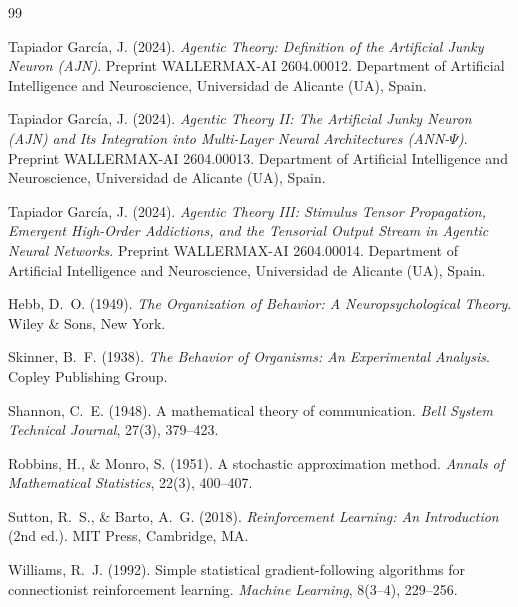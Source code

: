 \documentclass[12pt,a4paper]{article}
\begin{document}
\begin{thebibliography}{99}


Tapiador Garc\'ia, J. (2024).
\textit{Agentic Theory: Definition of the Artificial Junky Neuron (AJN)}.
Preprint WALLERMAX-AI 2604.00012.
Department of Artificial Intelligence and Neuroscience,
Universidad de Alicante (UA), Spain.

Tapiador Garc\'ia, J. (2024).
\textit{Agentic Theory II: The Artificial Junky Neuron (AJN) and Its Integration
into Multi-Layer Neural Architectures (ANN-$\Psi$)}.
Preprint WALLERMAX-AI 2604.00013.
Department of Artificial Intelligence and Neuroscience,
Universidad de Alicante (UA), Spain.

Tapiador Garc\'ia, J. (2024).
\textit{Agentic Theory III: Stimulus Tensor Propagation, Emergent High-Order
Addictions, and the Tensorial Output Stream in Agentic Neural Networks}.
Preprint WALLERMAX-AI 2604.00014.
Department of Artificial Intelligence and Neuroscience,
Universidad de Alicante (UA), Spain.


Hebb, D.~O. (1949).
\textit{The Organization of Behavior: A Neuropsychological Theory}.
Wiley \& Sons, New York.

Skinner, B.~F. (1938).
\textit{The Behavior of Organisms: An Experimental Analysis}.
Copley Publishing Group.

Shannon, C.~E. (1948).
A mathematical theory of communication.
\textit{Bell System Technical Journal}, 27(3), 379--423.

Robbins, H., \& Monro, S. (1951).
A stochastic approximation method.
\textit{Annals of Mathematical Statistics}, 22(3), 400--407.


Sutton, R.~S., \& Barto, A.~G. (2018).
\textit{Reinforcement Learning: An Introduction} (2nd ed.).
MIT Press, Cambridge, MA.

Williams, R.~J. (1992).
Simple statistical gradient-following algorithms for connectionist reinforcement
learning.
\textit{Machine Learning}, 8(3--4), 229--256.


\end{thebibliography}
\end{document}
